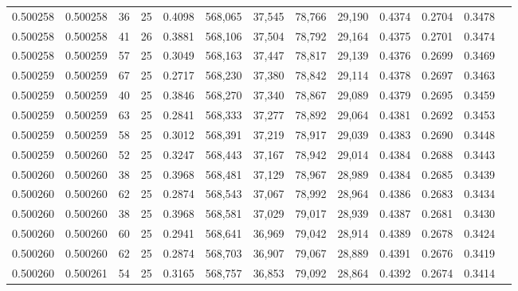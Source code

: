 \begin{tabular}{rrrrrrrrrrrrr}
0.500258 & 0.500258 &    36 &  25 &                                     0.4098 & 568,065 &  37,545 &  78,766 &  29,190 & 0.4374 & 0.2704 & 0.3478 \\
0.500258 & 0.500258 &    41 &  26 &                                     0.3881 & 568,106 &  37,504 &  78,792 &  29,164 & 0.4375 & 0.2701 & 0.3474 \\
0.500258 & 0.500259 &    57 &  25 &                                     0.3049 & 568,163 &  37,447 &  78,817 &  29,139 & 0.4376 & 0.2699 & 0.3469 \\
0.500259 & 0.500259 &    67 &  25 &                                     0.2717 & 568,230 &  37,380 &  78,842 &  29,114 & 0.4378 & 0.2697 & 0.3463 \\
0.500259 & 0.500259 &    40 &  25 &                                     0.3846 & 568,270 &  37,340 &  78,867 &  29,089 & 0.4379 & 0.2695 & 0.3459 \\
0.500259 & 0.500259 &    63 &  25 &                                     0.2841 & 568,333 &  37,277 &  78,892 &  29,064 & 0.4381 & 0.2692 & 0.3453 \\
0.500259 & 0.500259 &    58 &  25 &                                     0.3012 & 568,391 &  37,219 &  78,917 &  29,039 & 0.4383 & 0.2690 & 0.3448 \\
0.500259 & 0.500260 &    52 &  25 &                                     0.3247 & 568,443 &  37,167 &  78,942 &  29,014 & 0.4384 & 0.2688 & 0.3443 \\
0.500260 & 0.500260 &    38 &  25 &                                     0.3968 & 568,481 &  37,129 &  78,967 &  28,989 & 0.4384 & 0.2685 & 0.3439 \\
0.500260 & 0.500260 &    62 &  25 &                                     0.2874 & 568,543 &  37,067 &  78,992 &  28,964 & 0.4386 & 0.2683 & 0.3434 \\
0.500260 & 0.500260 &    38 &  25 &                                     0.3968 & 568,581 &  37,029 &  79,017 &  28,939 & 0.4387 & 0.2681 & 0.3430 \\
0.500260 & 0.500260 &    60 &  25 &                                     0.2941 & 568,641 &  36,969 &  79,042 &  28,914 & 0.4389 & 0.2678 & 0.3424 \\
0.500260 & 0.500260 &    62 &  25 &                                     0.2874 & 568,703 &  36,907 &  79,067 &  28,889 & 0.4391 & 0.2676 & 0.3419 \\
0.500260 & 0.500261 &    54 &  25 &                                     0.3165 & 568,757 &  36,853 &  79,092 &  28,864 & 0.4392 & 0.2674 & 0.3414 \\

\end{tabular}
